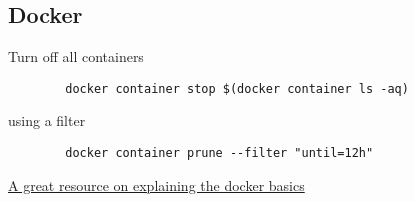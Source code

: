 \documentclass[../LabBook]{subfiles}
\begin{document}
    \subsection{Docker}
    Turn off all containers
    \begin{verbatim}
        docker container stop $(docker container ls -aq)
    \end{verbatim}

    using a filter
    \begin{verbatim}
        docker container prune --filter "until=12h"
    \end{verbatim}

    \href{https://stackoverflow.com/questions/35000484/how-to-tag-a-docker-container}{A great resource on explaining the docker basics}
\end{document}
